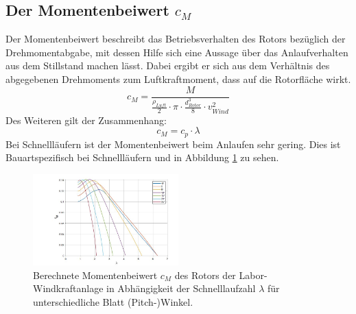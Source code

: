 \subsection{Der Momentenbeiwert \texorpdfstring{$c_M$}{}}
Der Momentenbeiwert beschreibt das Betriebsverhalten des Rotors bezüglich der Drehmomentabgabe, mit dessen Hilfe sich eine Aussage über das Anlaufverhalten aus dem Stillstand machen lässt. Dabei ergibt er sich aus dem Verhältnis des abgegebenen Drehmoments zum Luftkraftmoment, dass auf die Rotorfläche wirkt.
\begin{equation}
  c_{M}= \frac{M}{ \frac{\rho_{Luft}}{2}\cdot \pi \cdot \frac{d^3_{Rotor}}{8} \cdot v^2_{Wind} }
    \label{eq:Momentenbeiwert_cm}
\end{equation}
Des Weiteren gilt der Zusammenhang:
\begin{equation}
  c_{M}= c_{p} \cdot \lambda
    \label{eq:Momentenbeiwert_cm2}
\end{equation}
Bei Schnellläufern ist der Momentenbeiwert beim Anlaufen sehr gering. Dies ist Bauartspezifisch bei Schnellläufern und in Abbildung \ref{fig:cmzulambda} zu sehen.
\begin{figure}[h!]
    \centering
    \includegraphics[width=0.5\textwidth]{Abbildungen/cm.jpg}
    \caption{Berechnete Momentenbeiwert $c_{M}$ des Rotors der Labor-Windkraftanlage in Abhängigkeit der Schnelllaufzahl $\lambda$ für unterschiedliche Blatt (Pitch-)Winkel.\cite{Anleitung} }
    \label{fig:cmzulambda}
\end{figure}
